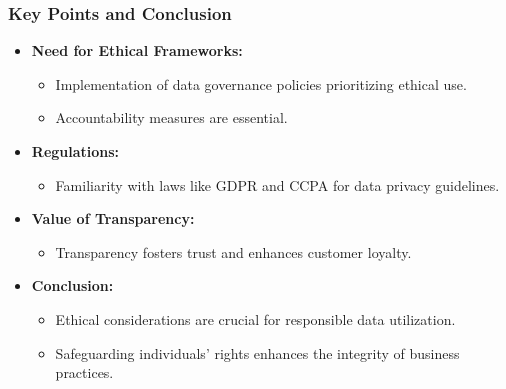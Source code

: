 \documentclass[aspectratio=169]{beamer}
\begin{document}
\begin{frame}[fragile]
    \frametitle{Key Points and Conclusion}
    \begin{itemize}
        \item \textbf{Need for Ethical Frameworks:}
        \begin{itemize}
            \item Implementation of data governance policies prioritizing ethical use.
            \item Accountability measures are essential.
        \end{itemize}
        
        \item \textbf{Regulations:}
        \begin{itemize}
            \item Familiarity with laws like GDPR and CCPA for data privacy guidelines.
        \end{itemize}
        
        \item \textbf{Value of Transparency:}
        \begin{itemize}
            \item Transparency fosters trust and enhances customer loyalty.
        \end{itemize}
        
        \item \textbf{Conclusion:}
        \begin{itemize}
            \item Ethical considerations are crucial for responsible data utilization.
            \item Safeguarding individuals' rights enhances the integrity of business practices.
        \end{itemize}
    \end{itemize}
\end{frame}
\end{document}
